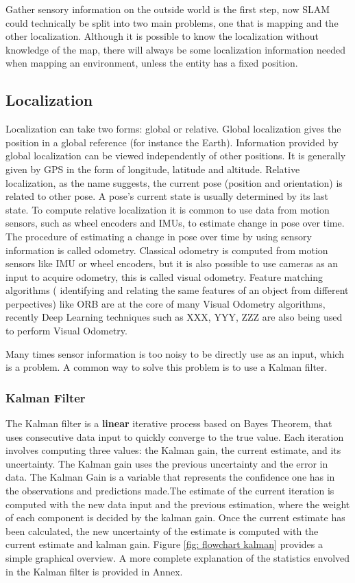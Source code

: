 Gather sensory information on the outside world is the first step, now \acs*{SLAM} could technically be split into two main problems, one that is mapping and the other localization. Although it is possible to know the localization without knowledge of the map, there will always be some localization information needed when mapping an environment, unless the entity has a fixed position.

\subsection{Localization}
Localization can take two forms: global or relative. 
Global localization gives the position in a global reference (for instance the Earth). Information provided by global localization can be viewed independently of other positions. It is generally given by \acs*{GPS} in the form of longitude, latitude and altitude.
Relative localization, as the name suggests, the current pose (position and orientation) is related to other pose. A pose's current state is usually determined by its last state. To compute relative localization it is common to use data from motion sensors, such as wheel encoders and \acs*{IMU}s, to estimate change in pose over time.
The procedure of estimating a change in pose over time by using sensory information is called odometry. Classical odometry is computed from motion sensors like \acs*{IMU} or wheel encoders, but it is also possible to use cameras as an input to acquire odometry, this is called visual odometry. Feature matching algorithms ( identifying and relating the same features of an object from different perpectives) like ORB \cite{rublee_orb_2011} are at the core of many Visual Odometry algorithms, recently Deep Learning techniques such as XXX, YYY, ZZZ are also being used to perform Visual Odometry.

Many times sensor information is too noisy to be directly use as an input, which is a problem. A common way to solve this problem is to use a Kalman filter.

\subsubsection{Kalman Filter}
The Kalman filter is a \textbf{linear} iterative process based on Bayes Theorem, that uses consecutive data input to quickly converge to the true value. Each iteration involves computing three values: the Kalman gain, the current estimate, and its uncertainty. The Kalman gain uses the previous uncertainty and the error in data. The Kalman Gain is a variable that represents the confidence one has in the observations and predictions made.The estimate of the current iteration is computed with the new data input and the previous estimation, where the weight of each component is decided by the kalman gain. Once the current estimate has been calculated, the new uncertainty of the estimate is computed with the current estimate and kalman gain. Figure \ref*{fig: flowchart kalman} provides a simple graphical overview. A more complete explanation of the statistics envolved in the Kalman filter is provided in Annex. 

